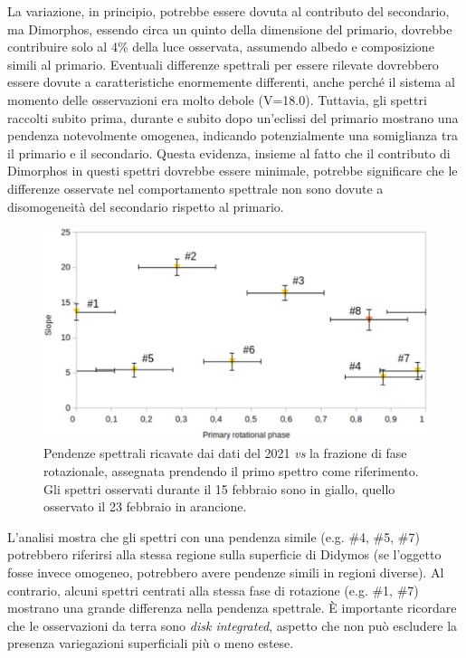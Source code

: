 \documentclass[a4paper,11pt,openright]{book}
\begin{document}
La variazione, in principio, potrebbe essere dovuta al contributo del secondario, ma Dimorphos, essendo circa un quinto della dimensione del primario, dovrebbe contribuire solo al 4\% della luce osservata, assumendo albedo e composizione simili al primario. Eventuali differenze spettrali per essere rilevate dovrebbero essere dovute a caratteristiche enormemente differenti, anche perché il sistema al momento delle osservazioni era molto debole (V=18.0). Tuttavia, gli spettri raccolti subito prima, durante e subito dopo un'eclissi del primario mostrano una pendenza notevolmente omogenea, indicando potenzialmente una somiglianza tra il primario e il secondario. Questa evidenza, insieme al fatto che il contributo di Dimorphos in questi spettri dovrebbe essere minimale, potrebbe significare che le differenze osservate nel comportamento spettrale non sono dovute a disomogeneità del secondario rispetto al primario.

\begin{figure}[!h]
    \centering
    \includegraphics[scale=0.7]{figure/slope_ieva.jpg}
    \caption[Pendenze spettrali dei dati del 2021.]{Pendenze spettrali ricavate dai dati del 2021 \textit{vs} la frazione di fase rotazionale, assegnata prendendo il primo spettro come riferimento. Gli spettri osservati durante il 15 febbraio sono in giallo, quello osservato il 23 febbraio in arancione. \citep{ieva_spectral_2022}}
    \label{fig:slope_ieva}
\end{figure}

L'analisi mostra che gli spettri con una pendenza simile (e.g. \#4, \#5, \#7) potrebbero riferirsi alla stessa regione sulla superficie di Didymos (se l'oggetto fosse invece omogeneo, potrebbero avere pendenze simili in regioni diverse). Al contrario, alcuni spettri centrati alla stessa fase di rotazione (e.g. \#1, \#7) mostrano una grande differenza nella pendenza spettrale. È importante ricordare che le osservazioni da terra sono \textit{disk integrated}, aspetto che non può escludere la presenza variegazioni superficiali più o meno estese.
\end{document}
